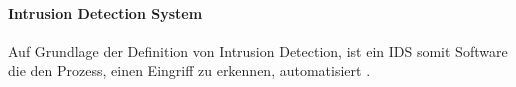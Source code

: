 \paragraph{Intrusion Detection System}
Auf Grundlage der Definition von Intrusion Detection, ist ein IDS somit Software die den Prozess, einen Eingriff zu erkennen, automatisiert \cite{scarfone2007guide}.




